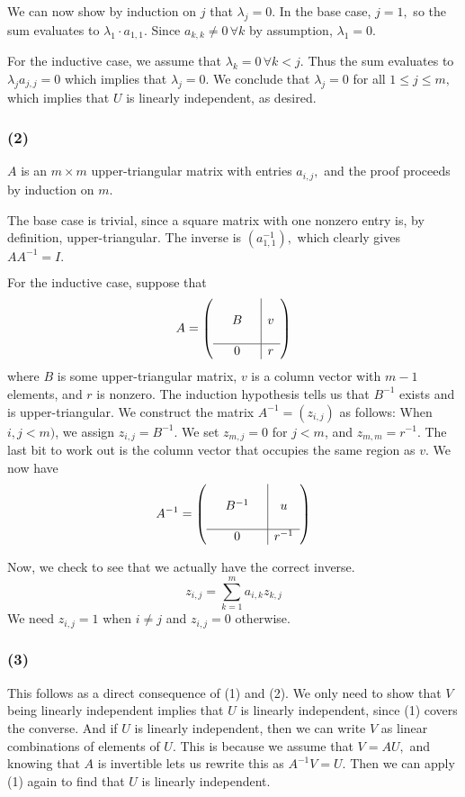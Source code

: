 \documentclass{article}
\begin{document}
We can now show by induction on $j$ that $\lambda_j = 0$.
In the base case, $j = 1,$ so the sum evaluates to $\lambda_1 \cdot a_{1,1}$.
Since $a_{k,k} \neq 0\, \forall k$ by assumption, $\lambda_1 = 0$.

For the inductive case, we assume that $\lambda_k = 0\, \forall k < j.$ Thus
the sum evaluates to $\lambda_j a_{j,j} = 0$ which implies that $\lambda_j=0$.
We conclude that $\lambda_j = 0$ for all $1 \leq j \leq m,$ which implies that
$U$ is linearly independent, as desired.

\subsubsection{(2)}
$A$ is an $m\times m$ upper-triangular matrix with entries $a_{i,j},$ and the proof proceeds
by induction on $m$.

The base case is trivial, since a square matrix with one nonzero entry is, by
definition, upper-triangular. The inverse is $(a_{1,1}^{-1}),$ which clearly
gives $AA^{-1} = I.$

For the inductive case, suppose that 
\[A=\left(
\begin{array}{ccc|c}
& && \\
&B&&v\\
& && \\
\hline
&0&&r
\end{array}
\right)\]
where $B$ is some upper-triangular matrix, $v$ is a column vector with $m-1$
elements, and $r$ is nonzero. The induction hypothesis tells us that $B^{-1}$
exists and is upper-triangular. We construct the matrix $A^{-1} = (z_{i,j})$
as follows:
When $i,j < m)$, we assign $z_{i,j} = B^{-1}.$ We set $z_{m,j}=0$ for $j < m$,
and $z_{m,m} = r^{-1}.$ The last bit to work out is the column vector that
occupies the same region as $v.$
We now have
\[A^{-1}=\left(
\begin{array}{ccc|c}
& && \\
&B^{-1}&&u\\
& && \\
\hline
&0&&r^{-1}
\end{array}
\right)\]

Now, we check to see that we actually have the correct inverse.
\[z_{i,j} = \sum_{k=1}^m a_{i,k}z_{k,j} \]
We need $z_{i,j} = 1$ when $i \neq j$ and $z_{i,j} = 0$ otherwise.


\subsubsection{(3)}
This follows as a direct consequence of (1) and (2). We only need to show that
$V$ being linearly independent implies that $U$ is linearly independent, since
(1) covers the converse. And if $U$ is linearly independent, then we can write
$V$ as linear combinations of elements of $U$. This is because we assume that
$V = AU,$ and knowing that $A$ is invertible lets us rewrite this as 
$A^{-1}V = U$.
Then we can apply (1) again to find that $U$ is linearly independent.
\end{document}
